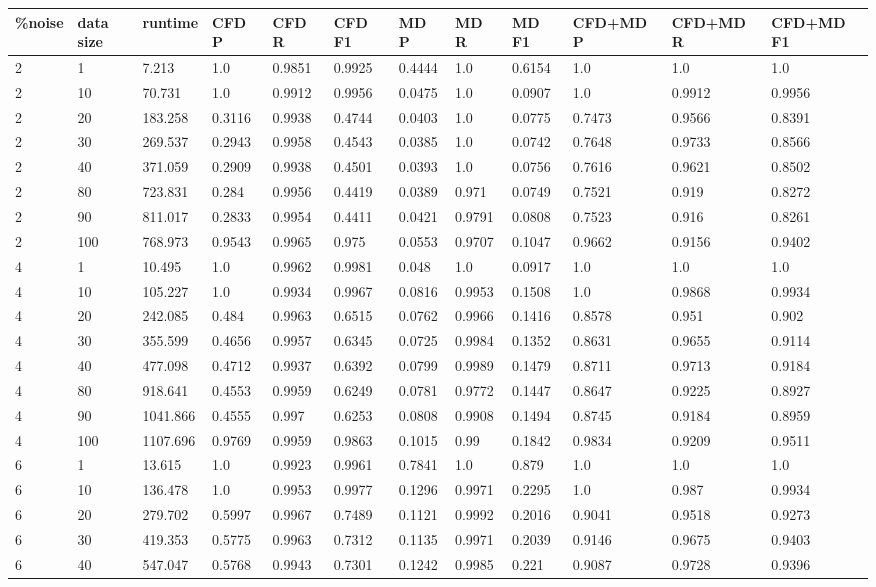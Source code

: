 \begin{table*}[!htbp]
\begin{tabular}{@{}llllllllllll@{}}
\toprule
{\%noise} & data size & runtime & CFD P & CFD R & CFD F1 & MD P & MD R & MD F1 & CFD+MD P & CFD+MD R & CFD+MD F1 \\ \midrule
2&1&7.213&1.0&0.9851&0.9925&0.4444&1.0&0.6154&1.0&1.0&1.0 \\
2&10&70.731&1.0&0.9912&0.9956&0.0475&1.0&0.0907&1.0&0.9912&0.9956 \\
2&20&183.258&0.3116&0.9938&0.4744&0.0403&1.0&0.0775&0.7473&0.9566&0.8391 \\
2&30&269.537&0.2943&0.9958&0.4543&0.0385&1.0&0.0742&0.7648&0.9733&0.8566 \\
2&40&371.059&0.2909&0.9938&0.4501&0.0393&1.0&0.0756&0.7616&0.9621&0.8502 \\
2&80&723.831&0.284&0.9956&0.4419&0.0389&0.971&0.0749&0.7521&0.919&0.8272 \\
2&90&811.017&0.2833&0.9954&0.4411&0.0421&0.9791&0.0808&0.7523&0.916&0.8261 \\
2&100&768.973&0.9543&0.9965&0.975&0.0553&0.9707&0.1047&0.9662&0.9156&0.9402 \\
4&1&10.495&1.0&0.9962&0.9981&0.048&1.0&0.0917&1.0&1.0&1.0 \\
4&10&105.227&1.0&0.9934&0.9967&0.0816&0.9953&0.1508&1.0&0.9868&0.9934 \\
4&20&242.085&0.484&0.9963&0.6515&0.0762&0.9966&0.1416&0.8578&0.951&0.902 \\
4&30&355.599&0.4656&0.9957&0.6345&0.0725&0.9984&0.1352&0.8631&0.9655&0.9114 \\
4&40&477.098&0.4712&0.9937&0.6392&0.0799&0.9989&0.1479&0.8711&0.9713&0.9184 \\
4&80&918.641&0.4553&0.9959&0.6249&0.0781&0.9772&0.1447&0.8647&0.9225&0.8927 \\
4&90&1041.866&0.4555&0.997&0.6253&0.0808&0.9908&0.1494&0.8745&0.9184&0.8959 \\
4&100&1107.696&0.9769&0.9959&0.9863&0.1015&0.99&0.1842&0.9834&0.9209&0.9511 \\
6&1&13.615&1.0&0.9923&0.9961&0.7841&1.0&0.879&1.0&1.0&1.0 \\
6&10&136.478&1.0&0.9953&0.9977&0.1296&0.9971&0.2295&1.0&0.987&0.9934 \\
6&20&279.702&0.5997&0.9967&0.7489&0.1121&0.9992&0.2016&0.9041&0.9518&0.9273 \\
6&30&419.353&0.5775&0.9963&0.7312&0.1135&0.9971&0.2039&0.9146&0.9675&0.9403 \\
6&40&547.047&0.5768&0.9943&0.7301&0.1242&0.9985&0.221&0.9087&0.9728&0.9396 \\

\end{tabular}
\end{table*}

